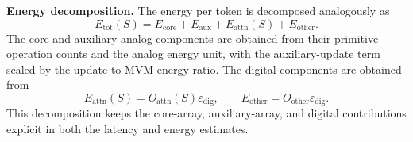 \documentclass[AMA,LATO1COL]{WileyNJDv5}
\begin{document}
\noindent\textbf{Energy decomposition.}
The energy per token is decomposed analogously as
\begin{equation}
E_{\mathrm{tot}}(S)
=
E_{\mathrm{core}}
+
E_{\mathrm{aux}}
+
E_{\mathrm{attn}}(S)
+
E_{\mathrm{other}}.
\label{eq:supp_total_energy}
\end{equation}
The core and auxiliary analog components are obtained from their primitive-operation counts and the analog energy unit, with the auxiliary-update term scaled by the update-to-MVM energy ratio. The digital components are obtained from
\begin{equation}
E_{\mathrm{attn}}(S)=O_{\mathrm{attn}}(S)\varepsilon_{\mathrm{dig}},
\qquad
E_{\mathrm{other}}=O_{\mathrm{other}}\varepsilon_{\mathrm{dig}}.
\label{eq:supp_digital_energy}
\end{equation}
This decomposition keeps the core-array, auxiliary-array, and digital contributions explicit in both the latency and energy estimates.
\end{document}
